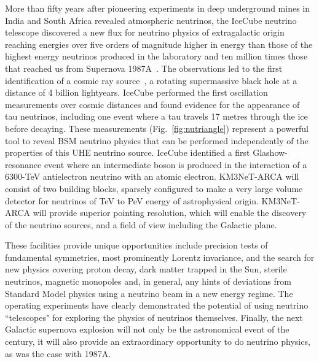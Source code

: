 More than fifty years after pioneering experiments in deep underground mines in India and South Africa revealed atmospheric neutrinos, the IceCube neutrino telescope discovered a new flux for neutrino physics of extragalactic origin reaching energies over five orders of magnitude higher in energy than those of the highest energy neutrinos produced in the laboratory and ten million times those that reached us from Supernova 1987A~\cite{Ahlers:2018fkn}. The observations led to the first identification of a cosmic ray source~\cite{IceCube:2018dnn}, a rotating supermassive black hole at a distance of 4 billion lightyears. IceCube performed the first oscillation measurements over cosmic distances and found evidence for the appearance of tau neutrinos, including one event where a tau travels 17 metres through the ice before decaying. These measurements (Fig.~\ref{fig:nutriangle}) represent a powerful tool to reveal BSM neutrino physics that can be performed independently of the properties of this UHE neutrino source. IceCube identified a first Glashow-resonance event where an intermediate boson is produced in the interaction of a 6300-TeV antielectron neutrino with an atomic electron. KM3NeT-ARCA will consist of two building blocks, sparsely configured to make a very large volume detector for neutrinos of TeV to PeV energy of astrophysical origin. KM3NeT-ARCA will provide superior pointing resolution, which will enable the discovery of the neutrino sources, and a field of view including the Galactic plane.

These facilities provide unique opportunities include precision tests of fundamental symmetries, most prominently Lorentz invariance, and the search for new physics covering proton decay, dark matter trapped in the Sun, sterile neutrinos, magnetic monopoles and, in general, any hints of deviations from Standard Model physics using a neutrino beam in a new energy regime. The operating experiments have clearly demonstrated the potential of using neutrino ``telescopes" for exploring the physics of neutrinos themselves. Finally, the next Galactic supernova explosion will not only be the astronomical event of the century, it will also provide an extraordinary opportunity to do neutrino physics, as was the case with 1987A.


